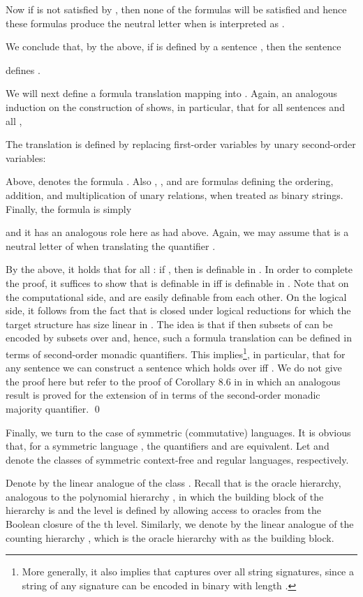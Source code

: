 \documentclass{LMCS}
\begin{document}
Now if  is not satisfied by , then none of the formulas 
will be satisfied and hence these formulas produce the neutral letter  when  is interpreted as .

We conclude that, by the above,  if  is defined by a sentence , then the  sentence 

defines .

We will next define a formula translation    mapping   into . Again,
an analogous induction on the construction of  shows, in particular, that  for all sentences  and all , 

The translation   is defined by replacing first-order variables by unary second-order variables:

Above,    denotes the formula . Also  ,  , and    are  formulas defining the ordering, addition, and multiplication of unary relations,  when treated  as binary strings. Finally,
the formula  is simply

and it has an analogous role here as  had above. Again, we may assume
that  is a neutral letter of  when translating the quantifier .


By the above, it holds that  for all : if , then  is definable in . In order to complete the proof, it suffices to show that    is  definable in 
iff    is  definable in .  Note that on the computational side,  and  are easily definable from each other. On the logical side, it follows from the fact that   is  closed under logical reductions  for which the target structure   has size linear in . The idea is that if   then  subsets of  can be encoded by   subsets over  and, hence, such a formula translation can be defined in terms of second-order monadic quantifiers. 
 This implies\footnote{More generally, it also implies that  captures  over all string signatures, since a string  of any signature can be encoded in binary with length .}, in particular, that for any sentence  we can construct a sentence  which holds over  iff . We do not give the proof here but refer to the proof of Corollary 8.6 in \cite{Kon3} in which an analogous result is proved for the extension of  in terms of the second-order monadic majority quantifier.
\qed

Finally, we turn to the case of symmetric (commutative) languages. It is obvious that, for a symmetric language , the quantifiers   and  are equivalent. Let  and  denote the classes of symmetric context-free and regular languages, respectively. 

Denote by  the linear analogue of the class . Recall that    is the oracle hierarchy, analogous to the polynomial hierarchy , in which the building block of the hierarchy is   and the   level is defined by allowing access to oracles from the Boolean closure of the th level. Similarly, we denote by  the linear analogue of the counting hierarchy , which is the oracle hierarchy with  as the building block. 
\end{document}
